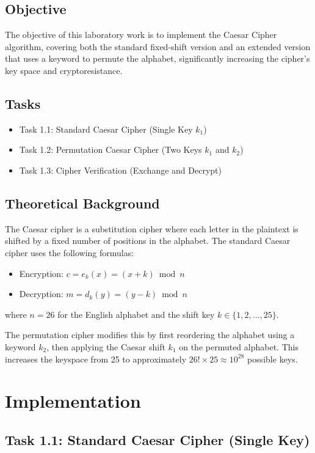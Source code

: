 \documentclass[a4paper,12pt]{article}
\begin{document}
\subsection{Objective}
\label{sec:org2501181}
The objective of this laboratory work is to implement the Caesar Cipher algorithm, covering both the standard fixed-shift version and an extended version that uses a keyword to permute the alphabet, significantly increasing the cipher's key space and cryptoresistance.
\subsection{Tasks}
\label{sec:org2732daa}
\begin{itemize}
\item Task 1.1: Standard Caesar Cipher (Single Key \(k_{1}\))
\item Task 1.2: Permutation Caesar Cipher (Two Keys \(k_{1}\) and \(k_{2}\))
\item Task 1.3: Cipher Verification (Exchange and Decrypt)
\end{itemize}
\subsection{Theoretical Background}
\label{sec:org42d0c6b}
The Caesar cipher is a substitution cipher where each letter in the plaintext is shifted by a fixed number of positions in the alphabet. The standard Caesar cipher uses the following formulas:

\begin{itemize}
\item Encryption: \(c = e_{k}(x) = (x + k) \bmod n\)
\item Decryption: \(m = d_{k}(y) = (y - k) \bmod n\)
\end{itemize}

where \(n = 26\) for the English alphabet and the shift key \(k \in \{1, 2, \ldots, 25\}\).

The permutation cipher modifies this by first reordering the alphabet using a keyword \(k_{2}\), then applying the Caesar shift \(k_{1}\) on the permuted alphabet. This increases the keyspace from 25 to approximately \(26! \times 25 \approx 10^{28}\) possible keys.
\section{Implementation}
\label{sec:org18ab313}
\subsection{Task 1.1: Standard Caesar Cipher (Single Key)}
\label{sec:orge24bda1}
\end{document}

